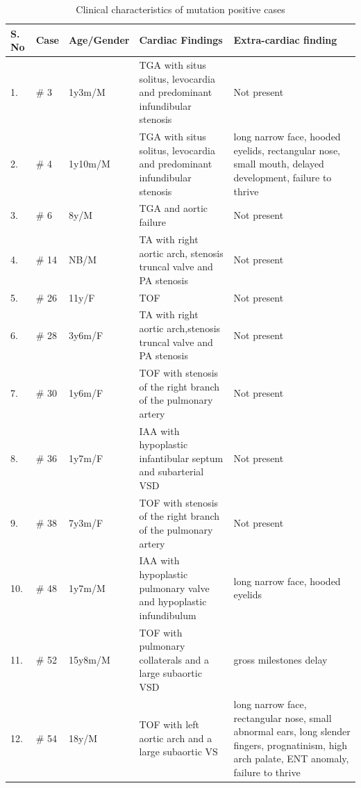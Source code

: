 \begin{refsection}
\begin{landscape}
\begin{spacing}{1}
\begin{longtable}{p{0.5in} p{0.5in} p{1in} p{3in} p{3in}}

\caption[Clinical characteristics of mutation positive cases]{Clinical characteristics of mutation positive cases}\\

           \toprule
          \textbf{S. No}
        & \textbf{Case}
        & \textbf{Age/Gender}
        & \textbf{Cardiac Findings}
        & \textbf{Extra-cardiac finding}
        \\* \toprule
	\endhead
 \label{tab:clinchar}  
   	
	1.  & \# 3 & 1y3m/M & TGA with situs solitus, levocardia and predominant infundibular stenosis & Not present \\ \midrule
	2.  & \# 4 & 1y10m/M & TGA with situs solitus, levocardia and predominant infundibular stenosis & long narrow face, hooded eyelids, rectangular nose, small mouth, delayed development, failure to thrive \\ \midrule
	3.  & \# 6 & 8y/M & TGA and aortic failure  & Not present \\ \midrule
	4.  & \# 14 & NB/M & TA with right aortic arch, stenosis truncal valve and PA stenosis & Not present \\ \midrule
	5.  & \# 26 & 11y/F & TOF & Not present \\ \midrule
	6.  & \# 28 & 3y6m/F & TA with right aortic arch,stenosis truncal valve and PA stenosis & Not present \\ \midrule
	7.  & \# 30 & 1y6m/F & TOF with stenosis of the right branch of the pulmonary artery & Not present \\ \midrule
	8.  & \# 36 & 1y7m/F & IAA with hypoplastic infantibular septum and subarterial VSD & Not present \\ \midrule
	9.  & \# 38 & 7y3m/F & TOF with stenosis of the right branch of the pulmonary artery & Not present \\ \midrule
	10.  & \# 48 & 1y7m/M & IAA with hypoplastic pulmonary valve and hypoplastic infundibulum & long narrow face, hooded eyelids \\ \midrule
	11.  & \# 52 & 15y8m/M & TOF with pulmonary collaterals and a large subaortic VSD & gross milestones delay \\ \midrule
	12.  & \# 54 & 18y/M & TOF with left aortic arch and a large subaortic VS & long narrow face, rectangular nose, small abnormal ears, long slender fingers, prognatinism, high arch palate, ENT anomaly, failure to thrive \\ \midrule

\end{longtable}
\end{spacing}
\end{landscape}
\end{refsection}
